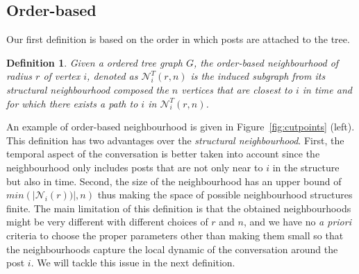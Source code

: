 \documentclass[conference]{IEEEtran}
\newtheorem{definition}{Definition}
\begin{document}
\subsection{Order-based}
Our first definition is based on the order in which posts are attached to the tree. 
\begin{definition}
Given a ordered tree graph $G$, the \textit{order-based neighbourhood} of radius $r$ of vertex $i$, denoted as $\mathcal{N}_{i}^T(r,n)$ is the induced subgraph from its structural neighbourhood composed the $n$ vertices that are closest to $i$ in time and for which there exists a path to $i$ in $\mathcal{N}_{i}^T(r,n)$.  
\end{definition}
An example of order-based neighbourhood is given in Figure~\ref{fig:cutpoints} (left).
This definition has two advantages over the \textit{structural neighbourhood}. First, the temporal aspect of the conversation is better taken into account since the neighbourhood only includes posts that are not only near to $i$ in the structure but also in time. Second, the size of the neighbourhood has an upper bound of $min(|\mathcal{N}_i(r))|, n)$ thus making the space of possible neighbourhood structures finite. The main limitation of this definition is that the obtained neighbourhoods might be very different with different choices of $r$ and $n$, and we have no \textit{a priori} criteria to choose the proper parameters other than making them small so that the neighbourhoods capture the local dynamic of the conversation around the post $i$. We will tackle this issue in the next definition.
\end{document}
